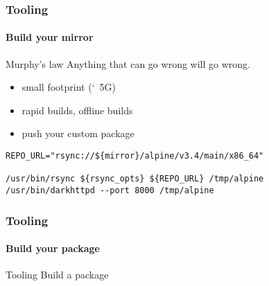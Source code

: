 \documentclass{beamer}
\begin{document}
\begin{frame}[fragile]
  \frametitle{Tooling}
  \framesubtitle{Build your mirror}

  \begin{exampleblock}{Murphy's law}
    \vskip2mm
    Anything that can go wrong will go wrong.
    \vskip2mm
  \end{exampleblock}

    \begin{itemize}
    \item small footprint (\char`~5G)
    \item rapid builds, offline builds
    \item push your custom package
  \end{itemize}

  \begin{verbatim}
REPO_URL="rsync://${mirror}/alpine/v3.4/main/x86_64"

/usr/bin/rsync ${rsync_opts} ${REPO_URL} /tmp/alpine
/usr/bin/darkhttpd --port 8000 /tmp/alpine
  \end{verbatim}
\end{frame}

\begin{frame}
  \frametitle{Tooling}
  \framesubtitle{Build your package}

\end{frame}

\begin{frame}{Tooling}
  Build a package
\end{frame}
\end{document}
